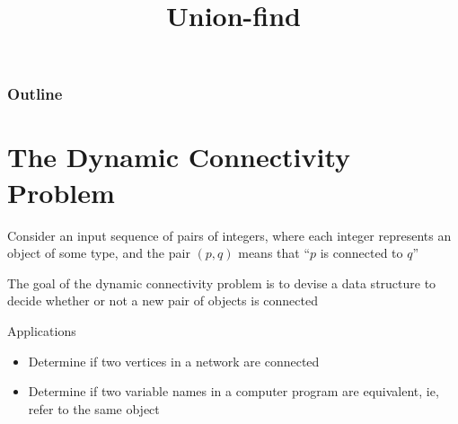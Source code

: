 \documentclass[8pt,a4paper,compress]{beamer}
\title{Union-find}
\date{}
\begin{document}
\begin{frame}
\vfill
\titlepage
\end{frame}

\begin{frame}
\frametitle{Outline}
\tableofcontents
\end{frame}

\section{The Dynamic Connectivity Problem}
\begin{frame}[fragile]
\begin{minipage}{250pt}
Consider an input sequence of pairs of integers, where each integer represents an object of some type, and the pair $(p, q)$ means that ``$p$ is connected to $q$''

\bigskip

The goal of the dynamic connectivity problem is to devise a data structure to decide whether or not a new pair of objects is connected 

\bigskip

Applications
\begin{itemize}
\item Determine if two vertices in a network are connected

\item Determine if two variable names in a computer program are equivalent, ie, refer to the same object


\end{itemize}
\end{minipage}
\end{frame}
\end{document}
